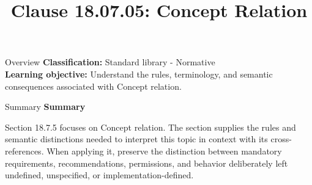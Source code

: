 \documentclass[10pt,letterpaper]{article}
\title{Clause 18.07.05: Concept Relation}
\author{}
\date{}
\begin{document}
\maketitle
\begin{CornellOverviewBox}{Overview}
\textbf{Classification:} Standard library - Normative\\[2pt]
\textbf{Learning objective:} Understand the rules, terminology, and semantic consequences associated with Concept relation.
\end{CornellOverviewBox}\begin{CornellSummaryBox}{Summary}
{\sffamily\bfseries\color{Accent} Summary}\par\vspace{3pt}Section 18.7.5 focuses on Concept relation. The section supplies the rules and semantic distinctions needed to interpret this topic in context with its cross-references. When applying it, preserve the distinction between mandatory requirements, recommendations, permissions, and behavior deliberately left undefined, unspecified, or implementation-defined.
\end{CornellSummaryBox}
\end{document}
